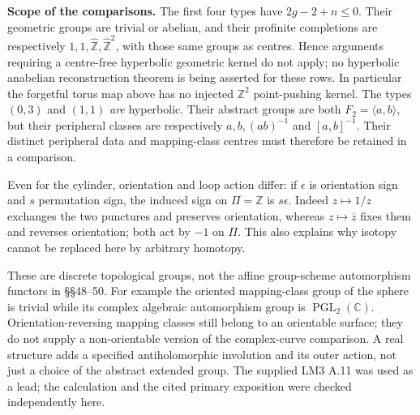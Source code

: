 \noindent\textbf{Scope of the comparisons.}
The first four types have \(2g-2+n\leq0\).
Their geometric groups are trivial or abelian, and their
profinite completions are respectively
\(1,1,\widehat{\mathbb Z},\widehat{\mathbb Z}^{2}\),
with those same groups as centres.  Hence arguments requiring
a centre-free hyperbolic geometric kernel do not apply; no
hyperbolic anabelian reconstruction theorem is being asserted
for these rows.  In particular the forgetful torus map above
has no injected \(\mathbb Z^2\) point-pushing kernel.
The types \((0,3)\) and \((1,1)\) \emph{are} hyperbolic.
Their abstract groups are both \(F_2=\langle a,b\rangle\),
but their peripheral classes are respectively
\(a,b,(ab)^{-1}\) and \([a,b]^{-1}\).
Their distinct peripheral data and mapping-class centres must
therefore be retained in a comparison.

Even for the cylinder, orientation and loop action differ:
if \(\epsilon\) is orientation sign and \(s\) permutation
sign, the induced sign on \(\Pi=\mathbb Z\) is \(s\epsilon\).
Indeed \(z\mapsto1/z\) exchanges the two punctures and
preserves orientation, whereas \(z\mapsto\overline z\)
fixes them and reverses orientation; both act by \(-1\)
on \(\Pi\).  This also explains why isotopy cannot be
replaced here by arbitrary homotopy.

These are discrete topological groups, not the affine
group-scheme automorphism functors in \S\S48--50.
For example the oriented mapping-class group of the sphere
is trivial while its complex algebraic automorphism group
is \(\operatorname{PGL}_2(\mathbb C)\).
Orientation-reversing mapping classes still belong to an
orientable surface; they do not supply a non-orientable version
of the complex-curve comparison.  A real structure adds a
specified antiholomorphic involution and its outer action,
not just a choice of the abstract extended group.
The supplied LM3 A.11 was used as a lead; the calculation and
the cited primary exposition were checked independently here.
